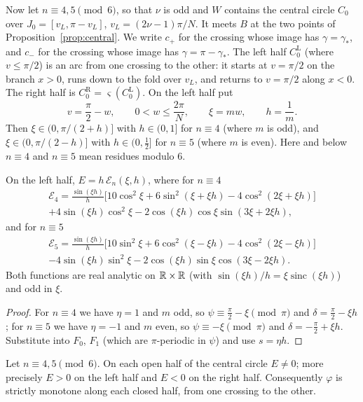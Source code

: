 Now let $n\equiv4,5\pmod6$, so that $\nu$ is odd and $W$ contains the central circle $C_0$ over
$J_0=[v_L,\pi-v_L]$, $v_L=(2\nu-1)\pi/N$. It meets $B$ at the two points of Proposition~\ref{prop:central}. We write
$c_+$ for the crossing whose image has $\gamma=\gamma_*$, and $c_-$ for the crossing whose image has $\gamma=\pi-\gamma_*$. The
left half $C_0^{\mathrm L}$ (where $v\le\pi/2$) is an arc from one crossing to the other: it starts at $v=\pi/2$ on the
branch $x>0$, runs down to the fold over $v_L$, and returns to $v=\pi/2$ along $x<0$. The right half is
$C_0^{\mathrm R}=\varsigma(C_0^{\mathrm L})$. On the left half put
\[
v=\frac\pi2-w,\qquad 0<w\le\frac{2\pi}{N},\qquad \xi=mw,\qquad h=\frac1m .
\]
Then $\xi\in(0,\pi/(2+h)]$ with $h\in(0,1]$ for $n\equiv4$ (where $m$ is odd), and $\xi\in(0,\pi/(2-h)]$ with $h\in(0,\frac12]$
for $n\equiv5$ (where $m$ is even). Here and below $n\equiv4$ and $n\equiv5$ mean residues modulo $6$.

\begin{lemma}\label{lem:centralE}
On the left half, $E=h\,\mathcal E_n(\xi,h)$, where for $n\equiv4$
\begin{multline*}
\mathcal E_4=\frac{\sin(\xi h)}{h}\bigl[10\cos^2\xi+6\sin^2(\xi+\xi h)-4\cos^2(2\xi+\xi h)\bigr]\\
+4\sin(\xi h)\cos^2\xi-2\cos(\xi h)\cos\xi\sin(3\xi+2\xi h),
\end{multline*}
and for $n\equiv5$
\begin{multline*}
\mathcal E_5=\frac{\sin(\xi h)}{h}\bigl[10\sin^2\xi+6\cos^2(\xi-\xi h)-4\cos^2(2\xi-\xi h)\bigr]\\
-4\sin(\xi h)\sin^2\xi-2\cos(\xi h)\sin\xi\cos(3\xi-2\xi h).
\end{multline*}
Both functions are real analytic on $\mathbb{R}\times\mathbb{R}$ (with $\sin(\xi h)/h=\xi\operatorname{sinc}(\xi h)$) and odd in $\xi$.
\end{lemma}

\begin{proof}
For $n\equiv4$ we have $\eta=1$ and $m$ odd, so $\psi\equiv\frac\pi2-\xi\pmod\pi$ and $\delta=\frac\pi2-\xi h$; for $n\equiv5$ we have
$\eta=-1$ and $m$ even, so $\psi\equiv-\xi\pmod\pi$ and $\delta=-\frac\pi2+\xi h$. Substitute into $F_0$, $F_1$ (which are
$\pi$-periodic in $\psi$) and use $s=\eta h$.
\end{proof}

\begin{theorem}\label{thm:central}
Let $n\equiv4,5\pmod6$. On each open half of the central circle $E\neq0$; more precisely $E>0$ on the left half and $E<0$
on the right half. Consequently $\varphi$ is strictly monotone along each closed half, from one crossing to the other.
\end{theorem}

